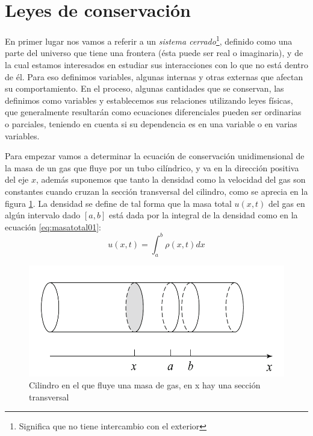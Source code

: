 \section{Leyes de conservación}
En primer lugar nos vamos a referir a un \textit{sistema cerrado}\footnote{Significa que no tiene intercambio
con el exterior}, definido como una parte del universo que tiene una frontera (ésta puede ser real o imaginaria), y de la 
cual estamos interesados en estudiar sus interacciones con lo que no está dentro de él.  Para eso definimos variables, algunas 
internas y otras externas que afectan su comportamiento. En el proceso, algunas cantidades que se conservan, las definimos como variables y establecemos sus relaciones utilizando leyes físicas, que generalmente resultarán como ecuaciones diferenciales pueden ser ordinarias o parciales, teniendo en cuenta si su dependencia es en una variable o en varias variables.

Para empezar vamos a determinar la ecuación de conservación unidimensional de la masa de un gas que fluye por un tubo cilíndrico, y va en la dirección positiva del eje $x$, además suponemos que tanto la densidad como la velocidad del gas son constantes cuando cruzan la sección transversal del cilindro, como se aprecia en la figura \ref{fig:cilindro01}. La densidad se define de tal forma que la masa total $u(x,t)$ del gas en algún intervalo dado $\left[a,b\right]$ está dada por la integral de la densidad como en la ecuación \eqref{eq:masatotal01}:
\begin{equation}\label{eq:masatotal01}
u(x,t)=\int_{a}^{b} \rho(x,t)dx
\end{equation}

\begin{figure}
    \centering
    \includegraphics[scale=0.5]{images/cilindro01.png}
    \caption{Cilindro en el que fluye una masa de gas, en x hay una sección transversal}
    \label{fig:cilindro01}
\end{figure}

